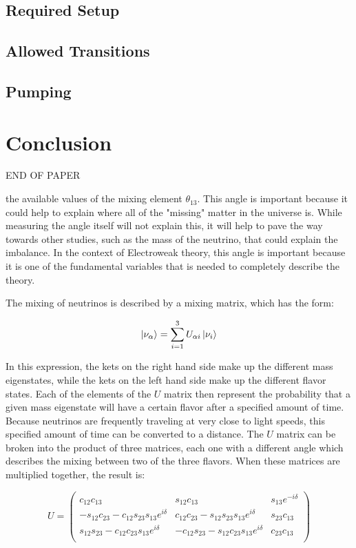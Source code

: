 \documentclass[letter,12pt]{article}
\begin{document}
	\subsection{Required Setup}

	\subsection{Allowed Transitions}

	\subsection{Pumping}

\section{Conclusion}
END OF PAPER

the available values of the mixing element $\theta_{13}$.
This angle is important because it could help to explain
where all of the "missing" matter in the universe is.
While measuring the angle itself will not explain this,
it will help to pave the way towards other studies, such
as the mass of the neutrino, that could explain the imbalance.
In the context of Electroweak theory, this angle is important
because it is one of the fundamental variables that is needed
to completely describe the theory.

The mixing of neutrinos is described by a mixing 
matrix, which has the form:

\begin{equation}
	\ket{\nu_\alpha} = \sum_{i=1}^{3} U_{\alpha i} \ket{\nu_i}
\end{equation}

In this expression, the kets on the right hand side make up
the different mass eigenstates, while the kets on the left hand
side make up the different flavor states. Each of 
the elements of the $U$ matrix then represent the probability
that a given mass eigenstate will have a certain flavor after 
a specified amount of time. Because neutrinos are frequently
traveling at very close to light speeds, this specified amount
of time can be converted to a distance. The $U$ matrix can be 
broken into the product of three matrices, each one with a
different angle which describes the mixing between two of the
three flavors. When these matrices are multiplied together, 
the result is:

\begin{equation}
	U=
	\begin{pmatrix}
		c_{12}c_{13} & s_{12}c_{13} & s_{13}e^{-i\delta}\\
		-s_{12}c_{23} -c_{12}s_{23}s_{13}e^{i\delta} & c_{12}c_{23} -s_{12}s_{23}s_{13}e^{i\delta} & s_{23}c_{13}\\
		s_{12}s_{23} -c_{12}c_{23}s_{13}e^{i\delta} & -c_{12}s_{23} -s_{12}c_{23}s_{13}e^{i\delta} & c_{23}c_{13}\\
	\end{pmatrix}
\end{equation}
\end{document}
